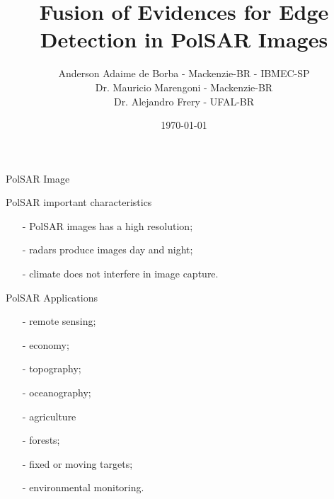 \documentclass[10pt]{beamer}
\title{Fusion of Evidences for Edge Detection in PolSAR Images}
\date{\today}
\author{Anderson Adaime de Borba - Mackenzie-BR - IBMEC-SP\\
        Dr. Mauricio Marengoni - Mackenzie-BR\\
        Dr. Alejandro Frery - UFAL-BR}
\institute{TENGARSS- 2019}
\begin{document}
\maketitle


\begin{frame}[fragile]{PolSAR Image}
\begin{alertblock}{PolSAR important characteristics}
\begin{itemize}
\item[-] PolSAR images has a high resolution;
\item[-] radars produce images day and night;
\item[-] climate does not interfere in image capture.
\end{itemize}
\end{alertblock}
\begin{alertblock}{PolSAR Applications}
\begin{itemize}
\item[-] remote sensing;
\item[-] economy;
\item[-] topography;
\item[-] oceanography;
\item[-] agriculture
\item[-] forests;
\item[-] fixed or moving targets;
\item[-] environmental monitoring.
\end{itemize}
\end{alertblock}
\end{frame}
\end{document}
